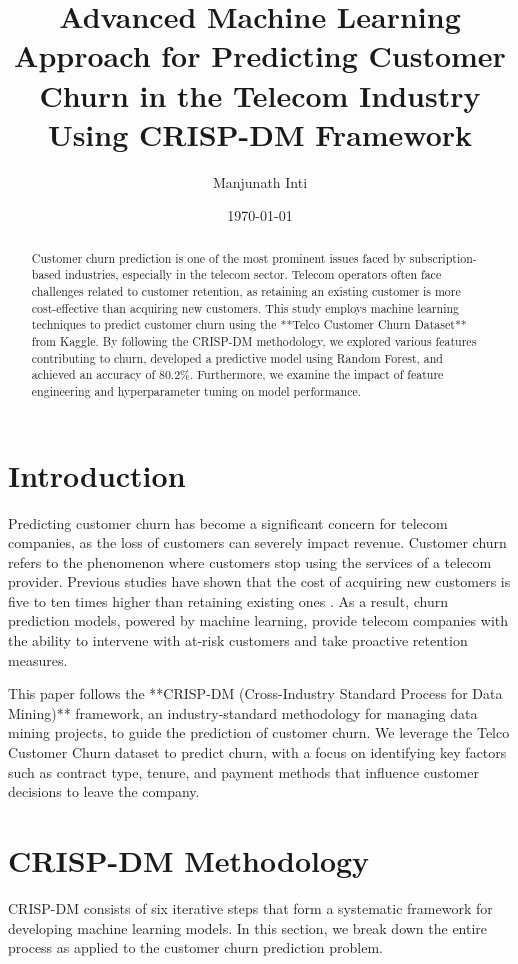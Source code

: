 \documentclass[12pt]{article}
\title{Advanced Machine Learning Approach for Predicting Customer Churn in the Telecom Industry Using CRISP-DM Framework}
\author{Manjunath Inti}
\date{\today}
\begin{document}
\maketitle

\begin{abstract}
Customer churn prediction is one of the most prominent issues faced by subscription-based industries, especially in the telecom sector. Telecom operators often face challenges related to customer retention, as retaining an existing customer is more cost-effective than acquiring new customers. This study employs machine learning techniques to predict customer churn using the **Telco Customer Churn Dataset** from Kaggle. By following the CRISP-DM methodology, we explored various features contributing to churn, developed a predictive model using Random Forest, and achieved an accuracy of 80.2\%. Furthermore, we examine the impact of feature engineering and hyperparameter tuning on model performance.
\end{abstract}

\section{Introduction}
Predicting customer churn has become a significant concern for telecom companies, as the loss of customers can severely impact revenue. Customer churn refers to the phenomenon where customers stop using the services of a telecom provider. Previous studies have shown that the cost of acquiring new customers is five to ten times higher than retaining existing ones \cite{Nguyen2012}. As a result, churn prediction models, powered by machine learning, provide telecom companies with the ability to intervene with at-risk customers and take proactive retention measures.

This paper follows the **CRISP-DM (Cross-Industry Standard Process for Data Mining)** framework, an industry-standard methodology for managing data mining projects, to guide the prediction of customer churn. We leverage the Telco Customer Churn dataset to predict churn, with a focus on identifying key factors such as contract type, tenure, and payment methods that influence customer decisions to leave the company.

\section{CRISP-DM Methodology}
CRISP-DM consists of six iterative steps that form a systematic framework for developing machine learning models. In this section, we break down the entire process as applied to the customer churn prediction problem.
\end{document}
